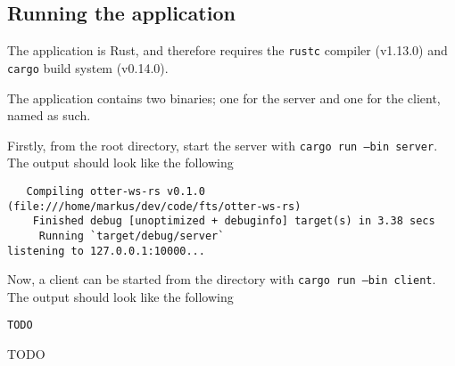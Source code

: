 
\subsection{Running the application}
The application is Rust, and therefore requires the {\tt rustc}
compiler (v1.13.0) and {\tt cargo} build system (v0.14.0).

The application contains two binaries; one for the server and one for
the client, named as such.

Firstly, from the root directory, start the server with {\tt cargo run
  --bin server}. The output should look like the following
\begin{verbatim}
   Compiling otter-ws-rs v0.1.0 (file:///home/markus/dev/code/fts/otter-ws-rs)
    Finished debug [unoptimized + debuginfo] target(s) in 3.38 secs
     Running `target/debug/server`
listening to 127.0.0.1:10000...
\end{verbatim}

Now, a client can be started from the directory with {\tt cargo run
  --bin client}. The output should look like the following
\begin{verbatim}
TODO
\end{verbatim}

TODO
